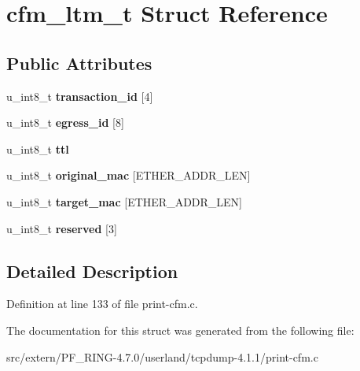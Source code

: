 \hypertarget{structcfm__ltm__t}{
\section{cfm\_\-ltm\_\-t Struct Reference}
\label{structcfm__ltm__t}
}
\subsection*{Public Attributes}
\begin{DoxyCompactItemize}
\item 
\hypertarget{structcfm__ltm__t_a576926a9e27e72cbaa0139bbf1c8c4d9}{
u\_\-int8\_\-t {\bfseries transaction\_\-id} \mbox{[}4\mbox{]}}
\label{structcfm__ltm__t_a576926a9e27e72cbaa0139bbf1c8c4d9}

\item 
\hypertarget{structcfm__ltm__t_af99fa3447d36480cfe42b49df0fa765b}{
u\_\-int8\_\-t {\bfseries egress\_\-id} \mbox{[}8\mbox{]}}
\label{structcfm__ltm__t_af99fa3447d36480cfe42b49df0fa765b}

\item 
\hypertarget{structcfm__ltm__t_a82adde01695df27fd528c287b0c3b781}{
u\_\-int8\_\-t {\bfseries ttl}}
\label{structcfm__ltm__t_a82adde01695df27fd528c287b0c3b781}

\item 
\hypertarget{structcfm__ltm__t_aef6f47d75592ed68f29071e3d44c1389}{
u\_\-int8\_\-t {\bfseries original\_\-mac} \mbox{[}ETHER\_\-ADDR\_\-LEN\mbox{]}}
\label{structcfm__ltm__t_aef6f47d75592ed68f29071e3d44c1389}

\item 
\hypertarget{structcfm__ltm__t_a5c908cc2e0b097cc296eaab67e7eb9d3}{
u\_\-int8\_\-t {\bfseries target\_\-mac} \mbox{[}ETHER\_\-ADDR\_\-LEN\mbox{]}}
\label{structcfm__ltm__t_a5c908cc2e0b097cc296eaab67e7eb9d3}

\item 
\hypertarget{structcfm__ltm__t_a2530e794e285d56cd920a85de3840fe7}{
u\_\-int8\_\-t {\bfseries reserved} \mbox{[}3\mbox{]}}
\label{structcfm__ltm__t_a2530e794e285d56cd920a85de3840fe7}

\end{DoxyCompactItemize}


\subsection{Detailed Description}


Definition at line 133 of file print-\/cfm.c.



The documentation for this struct was generated from the following file:\begin{DoxyCompactItemize}
\item 
src/extern/PF\_\-RING-\/4.7.0/userland/tcpdump-\/4.1.1/print-\/cfm.c\end{DoxyCompactItemize}
